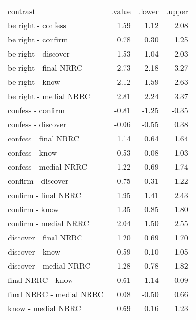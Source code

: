 \begin{longtable}{lrrr}
 contrast & .value & .lower & .upper \\ 
 be right - confess & 1.59 & 1.12 & 2.08 \\ 
  be right - confirm & 0.78 & 0.30 & 1.25 \\ 
  be right - discover & 1.53 & 1.04 & 2.03 \\ 
  be right - final NRRC & 2.73 & 2.18 & 3.27 \\ 
  be right - know & 2.12 & 1.59 & 2.63 \\ 
  be right - medial NRRC & 2.81 & 2.24 & 3.37 \\ 
  confess - confirm & -0.81 & -1.25 & -0.35 \\ 
  confess - discover & -0.06 & -0.55 & 0.38 \\ 
  confess - final NRRC & 1.14 & 0.64 & 1.64 \\ 
  confess - know & 0.53 & 0.08 & 1.03 \\ 
  confess - medial NRRC & 1.22 & 0.69 & 1.74 \\ 
  confirm - discover & 0.75 & 0.31 & 1.22 \\ 
  confirm - final NRRC & 1.95 & 1.41 & 2.43 \\ 
  confirm - know & 1.35 & 0.85 & 1.80 \\ 
  confirm - medial NRRC & 2.04 & 1.50 & 2.55 \\ 
  discover - final NRRC & 1.20 & 0.69 & 1.70 \\ 
  discover - know & 0.59 & 0.10 & 1.05 \\ 
  discover - medial NRRC & 1.28 & 0.78 & 1.82 \\ 
  final NRRC - know & -0.61 & -1.14 & -0.09 \\ 
  final NRRC - medial NRRC & 0.08 & -0.50 & 0.66 \\ 
  know - medial NRRC & 0.69 & 0.16 & 1.23 \\ 
  \end{longtable}

